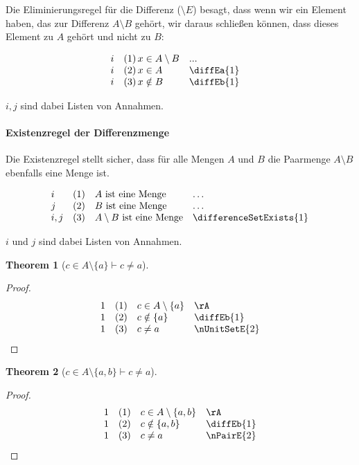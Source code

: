 \documentclass{book}
\theoremstyle{plain}
\newtheorem{theorem}{Theorem}
\theoremstyle{remark}
\theoremstyle{definition}
\begin{document}
Die Eliminierungsregel für die Differenz (\(\setminus E\)) besagt, dass wenn wir ein Element haben, das zur Differenz \(A \setminus B\) gehört, wir daraus schließen können, dass dieses Element zu \(A\) gehört und nicht zu \(B\):

\[
\begin{array}{llll}
	i & (1) \, x \in A \setminus B & ... & \\
	i & (2) \, x \in A & \diffEa{1} \\
	i & (3) \, x \notin B & \diffEb{1} \\
\end{array}
\]

\(i,j\) sind dabei Listen von Annahmen.

\paragraph{Existenzregel der Differenzmenge}
\label{rule:differenceSetExists}
Die Existenzregel stellt sicher, dass für alle Mengen \(A\) und \(B\) die Paarmenge \(A\setminus B\) ebenfalls eine Menge ist.

\[
\begin{array}{llll}
	i & (1) & A \text{ ist eine Menge} & \dots  \\
        j & (2) & B \text{ ist eine Menge} & \dots  \\
	i,j & (3) & A\setminus B\text{ ist eine Menge} & \differenceSetExists{1} \\
\end{array}
\]

\(i\) und \(j\) sind dabei Listen von Annahmen.

\label{cInASetminusLbaRbImpcNotEqualsa}
\begin{theorem}[\( c\in A\setminus\{a\}\vdash c\neq a \)]
\end{theorem}
\begin{proof}
    \[
	\begin{array}{llll}
	    1 & (1) & c\in A\setminus\{a\} & \rA \\
            1 & (2) & c\notin \{a\} & \diffEb{1} \\
		1 & (3) & c\neq a & \nUnitSetE{2} \\
	\end{array}
    \]
\end{proof}

\label{cInASetminusLbawbRbImpcNotEqualsa}
\begin{theorem}[\( c\in A\setminus\{a,b\}\vdash c\neq a \)]
\end{theorem}
\begin{proof}
    \[
	\begin{array}{llll}
		1 & (1) & c\in A\setminus\{a,b\} & \rA \\
		1 & (2) & c\notin \{a,b\} & \diffEb{1} \\
		1 & (3) & c\neq a & \nPairE{2} \\
	\end{array}
    \]
\end{proof}
\end{document}
